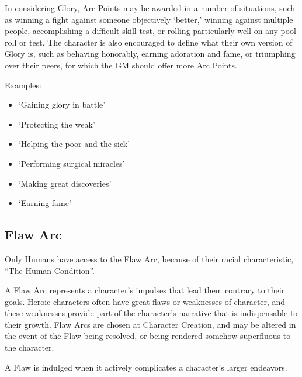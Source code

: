 \documentclass[oneside,11pt,english]{book}
\begin{document}
In considering Glory, Arc Points may be awarded in a number of situations, such
as winning a fight against someone objectively ‘better,’ winning against
multiple people, accomplishing a difficult skill test, or rolling particularly
well on any pool roll or test. The character is also encouraged to define what
their own version of Glory is, such as behaving honorably, earning adoration and
fame, or triumphing over their peers, for which the GM should offer more Arc
Points.

Examples: 
\begin{itemize}
\item ‘Gaining glory in battle’ 
\item ‘Protecting the weak’ 
\item ‘Helping the poor and the sick’ 
\item ‘Performing surgical miracles’ 
\item ‘Making great discoveries’ 
\item ‘Earning fame’ 
\end{itemize}

\subsection{Flaw Arc} 
Only Humans have access to the Flaw Arc, because of their racial characteristic,
``The Human Condition''.

A Flaw Arc represents a character’s impulses that lead them contrary to their
goals. Heroic characters often have great flaws or weaknesses of character, and
these weaknesses provide part of the character’s narrative that is indispensable
to their growth. Flaw Arcs are chosen at Character Creation, and may be altered
in the event of the Flaw being resolved, or being rendered somehow superfluous
to the character.

A Flaw is indulged when it actively complicates a character’s larger endeavors. 
\end{document}
